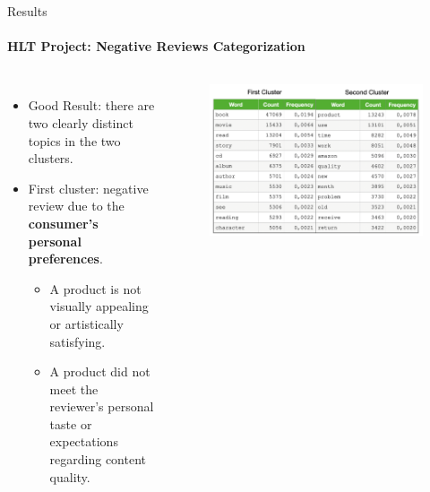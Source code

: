 \documentclass{beamer}
\theoremstyle{definition}
\theoremstyle{plain}
\begin{document}
\begin{frame}{Results}
\framesubtitle{HLT Project: Negative Reviews Categorization}
{\small 
    \begin{columns}
    \begin{itemize}
        \item Good Result: there are two clearly distinct topics in the two clusters.
            \item First cluster: negative review due to the \textbf{consumer's personal preferences}.
            \begin{itemize}
                \item A product is not visually appealing or artistically satisfying.
                \item A product did not meet the reviewer’s personal taste or expectations regarding content quality.
            \end{itemize}
    \end{itemize}

    \vspace{-0.7cm}
    \begin{figure}
        \centering
        \includegraphics[scale=0.35]{Figures/tabella.png}
    \end{figure}
    \end{columns}
}
\end{frame}
\end{document}
